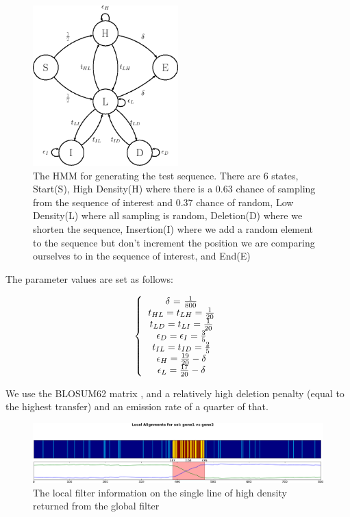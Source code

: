 \documentclass[phd,tocprelim]{cornell}
\begin{document}
\pagebreak

\begin{figure}[hpt]
	\centering
		\includegraphics[width=0.5\textwidth]{figures/velvetrope/HMMpic.png}
        \caption[HMM for synthetic NW comparison]{The HMM for generating the test sequence. There are 6 states, Start(S), High Density(H) where there is a 0.63 chance of sampling from the sequence of interest and 0.37 chance of random, Low Density(L) where all sampling is random, Deletion(D) where we shorten the sequence, Insertion(I) where we add a random element to the sequence but don't increment the position we are comparing ourselves to in the sequence of interest, and End(E)}
	\label{fig:99}
\end{figure}

The parameter values are set as follows:

\begin{equation}
    \left\{\begin{tabular}{c} $\delta$ = $\frac{1}{800}$ \\ $t_{HL} = t_{LH} = \frac{1}{20}$ \\ $t_{LD} = t_{LI} = \frac{1}{20}$ \\ $\epsilon_{D} = \epsilon_{I} = \frac{3}{5}$ \\ $t_{IL} = t_{ID} = \frac{2}{5}$ \\ $\epsilon_{H} = \frac{19}{20} - \delta$ \\ $\epsilon_{L} = \frac{17}{20} - \delta$ \end{tabular} \right.
\end{equation}

We use the BLOSUM62 matrix \cite{Henikoff1992}, and a relatively high deletion penalty (equal to the highest transfer) and an emission rate of a quarter of that.

\begin{figure}[hpt]
	\centering
		\includegraphics[width=1.0\textwidth]{figures/velvetrope/hmm1_1.png}
        \caption[Local Velvetrope filter of NW HMM test]{The local filter information on the single line of high density returned from the global filter}
	\label{fig:05}
\end{figure}
\end{document}
